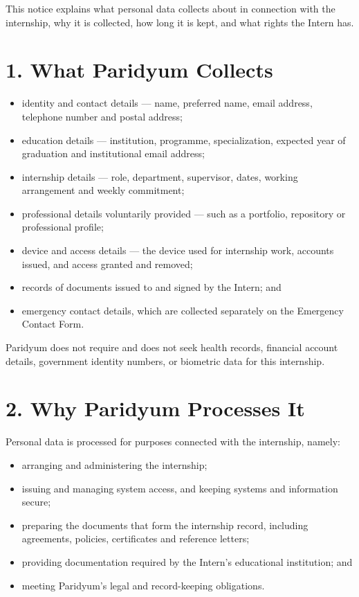 \documentclass{paridyum}
\begin{document}
\paridyumletterhead
\paridyumdateref{\dkDocDate}{\dkDocRef}

This notice explains what personal data \textbf{\dkOrgName} collects about
\textbf{\dkPIdentityLegalName} in connection with the internship, why it is collected, how
long it is kept, and what rights the Intern has.

\section*{1. What Paridyum Collects}
\begin{itemize}[leftmargin=*, noitemsep]
    \item identity and contact details --- name, preferred name, email address,
          telephone number and postal address;
    \item education details --- institution, programme, specialization, expected year
          of graduation and institutional email address;
    \item internship details --- role, department, supervisor, dates, working
          arrangement and weekly commitment;
    \item professional details voluntarily provided --- such as a portfolio,
          repository or professional profile;
    \item device and access details --- the device used for internship work, accounts
          issued, and access granted and removed;
    \item records of documents issued to and signed by the Intern; and
    \item emergency contact details, which are collected separately on the Emergency
          Contact Form.
\end{itemize}

Paridyum does not require and does not seek health records, financial account details,
government identity numbers, or biometric data for this internship.

\section*{2. Why Paridyum Processes It}
Personal data is processed for purposes connected with the internship, namely:
\begin{itemize}[leftmargin=*, noitemsep]
    \item arranging and administering the internship;
    \item issuing and managing system access, and keeping systems and information
          secure;
    \item preparing the documents that form the internship record, including
          agreements, policies, certificates and reference letters;
    \item providing documentation required by the Intern's educational institution;
          and
    \item meeting Paridyum's legal and record-keeping obligations.
\end{itemize}
\end{document}
